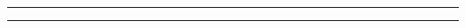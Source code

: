 \noindent\rule{7in}{1.5pt}


\begin{problem}{11.10}

\end{problem}
\begin{solution}

\end{solution}

\noindent\rule{7in}{1.5pt}

